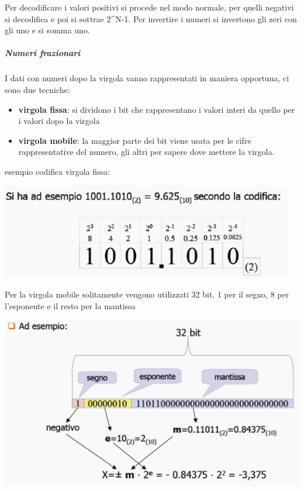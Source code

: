 \documentclass[
  paper=a4,
  oneside  ,captions=tableheading
]{scrbook}
\providecommand{\tightlist}{%
  \setlength{\itemsep}{0pt}\setlength{\parskip}{0pt}}
\begin{document}
Per decodificare i valori positivi si procede nel modo normale, per
quelli negativi si decodifica e poi si sottrae 2\^{}N-1. Per invertire i
numeri si invertono gli zeri con gli uno e si somma uno.

\hypertarget{numeri-frazionari}{%
\subparagraph{Numeri frazionari}\label{numeri-frazionari}}

I dati con numeri dopo la virgola vanno rappresentati in maniera
opportuna, ci sono due tecniche:

\begin{itemize}
\tightlist
\item
  \textbf{virgola fissa}: si dividono i bit che rappresentano i valori
  interi da quello per i valori dopo la virgola
\item
  \textbf{virgola mobile}: la maggior parte dei bit viene usata per le
  cifre rappresentative del numero, gli altri per sapere dove mettere la
  virgola.
\end{itemize}

esempio codifica virgola fissa:

\includegraphics{./image/image-20201212112345743.png}


Per la virgola mobile solitamente vengono utilizzati 32 bit, 1 per il
segno, 8 per l'esponente e il resto per la mantissa

\includegraphics{./image/image-20201212112608865.png}
\end{document}
